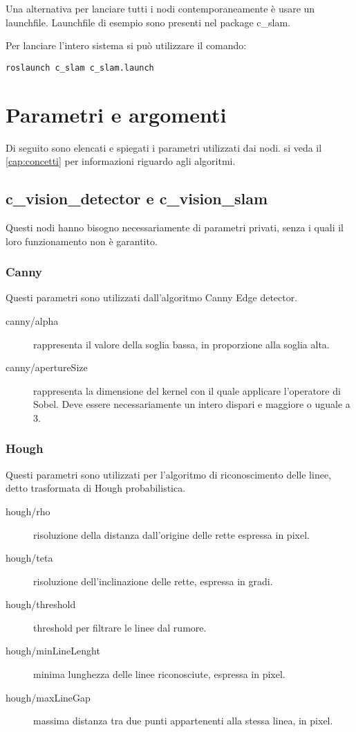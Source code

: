 Una alternativa per lanciare tutti i nodi contemporaneamente è usare un launchfile. Launchfile di esempio sono presenti nel package c\_slam.

Per lanciare l'intero sistema si può utilizzare il comando:

\begin{verbatim}
roslaunch c_slam c_slam.launch
\end{verbatim}


\section{Parametri e argomenti}

Di seguito sono elencati e spiegati i parametri utilizzati dai nodi. si veda il \autoref{cap:concetti} per informazioni riguardo agli algoritmi.

\subsection{c\_vision\_detector e c\_vision\_slam}

Questi nodi hanno bisogno necessariamente di parametri privati, senza i quali il loro funzionamento non è garantito.

\subsubsection{Canny}

Questi parametri sono utilizzati dall'algoritmo Canny Edge detector.

\begin{description}
 \item [canny/alpha] rappresenta il valore della soglia bassa, in proporzione alla soglia alta.
 \item [canny/apertureSize] rappresenta la dimensione del kernel con il quale applicare l'operatore di Sobel. Deve essere necessariamente un intero dispari e maggiore o uguale a 3. 
\end{description}

\subsubsection{Hough}

Questi parametri sono utilizzati per l'algoritmo di riconoscimento delle linee, detto trasformata di Hough probabilistica.

\begin{description}
 \item [hough/rho] risoluzione della distanza dall'origine delle rette espressa in pixel.
 \item [hough/teta] risoluzione dell'inclinazione delle rette, espressa in gradi.
 \item [hough/threshold] threshold per filtrare le linee dal rumore.
 \item [hough/minLineLenght] minima lunghezza delle linee riconosciute, espressa in pixel.
 \item [hough/maxLineGap] massima distanza tra due punti appartenenti alla stessa linea, in pixel.
\end{description}

